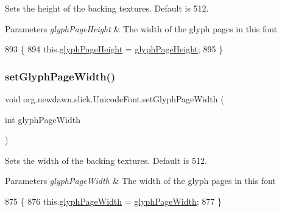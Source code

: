 Sets the height of the backing textures. Default is 512.


\begin{DoxyParams}{Parameters}
{\em glyph\+Page\+Height} & The width of the glyph pages in this font \\
\hline
\end{DoxyParams}

\begin{DoxyCode}
893                                                         \{
894         this.\mbox{\hyperlink{classorg_1_1newdawn_1_1slick_1_1_unicode_font_ac919dac32be8c1baf29a21625e0719b9}{glyphPageHeight}} = \mbox{\hyperlink{classorg_1_1newdawn_1_1slick_1_1_unicode_font_ac919dac32be8c1baf29a21625e0719b9}{glyphPageHeight}};
895     \}
\end{DoxyCode}
\mbox{\label{classorg_1_1newdawn_1_1slick_1_1_unicode_font_a83fbec1e5c863d4b3fbe77d9e9df740f}} 
\subsubsection{\texorpdfstring{set\+Glyph\+Page\+Width()}{setGlyphPageWidth()}}
{\footnotesize\ttfamily void org.\+newdawn.\+slick.\+Unicode\+Font.\+set\+Glyph\+Page\+Width (\begin{DoxyParamCaption}\item[{int}]{glyph\+Page\+Width }\end{DoxyParamCaption})\hspace{0.3cm}{\ttfamily [inline]}}

Sets the width of the backing textures. Default is 512.


\begin{DoxyParams}{Parameters}
{\em glyph\+Page\+Width} & The width of the glyph pages in this font \\
\hline
\end{DoxyParams}

\begin{DoxyCode}
875                                                       \{
876         this.\mbox{\hyperlink{classorg_1_1newdawn_1_1slick_1_1_unicode_font_a3fe610a3c34ca1aa69a118601e8cb2bc}{glyphPageWidth}} = \mbox{\hyperlink{classorg_1_1newdawn_1_1slick_1_1_unicode_font_a3fe610a3c34ca1aa69a118601e8cb2bc}{glyphPageWidth}};
877     \}
\end{DoxyCode}
\mbox{\label{classorg_1_1newdawn_1_1slick_1_1_unicode_font_a90716509cbd8266db885d4068b7129fe}} 

